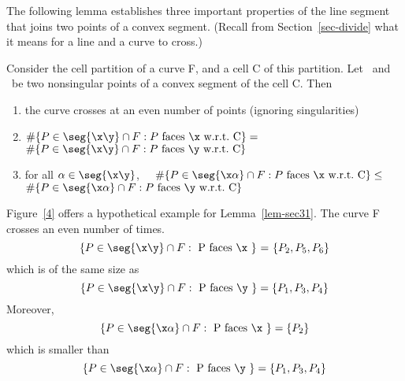 The following lemma establishes three important properties of the line
segment that joins two points of a convex segment.
(Recall from Section~\ref{sec-divide} what it means for a line and a curve
to cross.)
%
\begin{lemma}
\label{lem-sec31}
Consider the cell partition of a curve F, and a cell C of this partition.
Let \x\ and \y\ be two nonsingular points of a convex segment of the cell C.
Then
\begin{enumerate}
\item the curve crosses \seg{\x\y} at an even number of points (ignoring
singularities)
\item $\#\{P \in \seg{\x\y} \cap F: P \mbox{ faces \x\ w.r.t.\ C}\} = $\\
$\#\{P \in \seg{\x\y} \cap F: P \mbox{ faces \y\ w.r.t.\ C}\}$
\item for all $\alpha \in \seg{\x\y}$,\ \ \nopagebreak
$ \#\{P \in\seg{\x\alpha}\cap F: P \mbox{ faces \x\ w.r.t.\ C}\} \leq $\\
$ \#\{P \in \seg{\x\alpha}\cap F: P \mbox{ faces \y\ w.r.t.\ C}\} $
\end{enumerate}
\end{lemma}
%
%
\begin{example}
Figure~\ref{4} offers a hypothetical example for Lemma~\ref{lem-sec31}.
The curve F crosses \seg{\x\y} an even number of times.
\[ \{ P \in \seg{\x\y} \cap F:\mbox{ P faces \x\ \} = \{}P_{2},P_{5},P_{6}\}\]
which is of the same size as
\[ \{ P \in \seg{\x\y} \cap F:\mbox{ P faces \y } \} = \{P_{1},P_{3},P_{4}\}\]
Moreover,
\[ \{ P \in \seg{\x\alpha} \cap F: \mbox{ P faces \x } \} = \{P_{2}\} \]
which is smaller than
\[ \{ P \in \seg{\x\alpha} \cap F: \mbox{ P faces \y } \} = \{P_{1},P_{3},P_{4}\} \]
\end{example}
%
